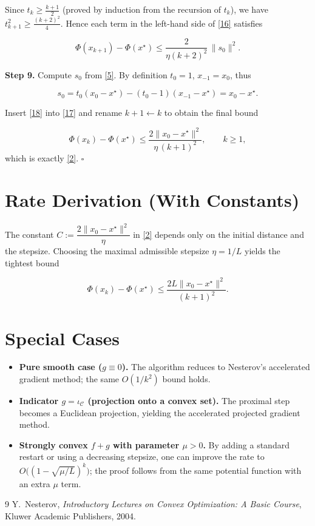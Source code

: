 \documentclass{article}
\begin{document}
Since $t_{k}\ge \frac{k+1}{2}$ (proved by induction from the recursion of $t_k$), we have $t_{k+1}^{2}\ge \frac{(k+2)^{2}}{4}$. Hence each term in the left-hand side of \eqref{16} satisfies  

\[
\Phi(x_{k+1})-\Phi(x^{\star})\le
\frac{2}{\eta (k+2)^{2}}\,\|s_{0}\|^{2}.
\tag{17}
\]

\noindent\textbf{Step 9.}  Compute $s_{0}$ from \eqref{5}.  By definition $t_{0}=1$, $x_{-1}=x_{0}$, thus  

\[
s_{0}=t_{0}(x_{0}-x^{\star})-(t_{0}-1)(x_{-1}-x^{\star})
= x_{0}-x^{\star}.
\tag{18}
\]

Insert \eqref{18} into \eqref{17} and rename $k+1\leftarrow k$ to obtain the final bound

\[
\Phi(x_{k})-\Phi(x^{\star})\le
\frac{2\|x_{0}-x^{\star}\|^{2}}{\eta\, (k+1)^{2}},\qquad k\ge 1,
\]
which is exactly \eqref{2}.  $\square$

\section*{Rate Derivation (With Constants)}
The constant $C:=\dfrac{2\|x_{0}-x^{\star}\|^{2}}{\eta}$ in \eqref{2} depends only on the initial distance and the stepsize.  Choosing the maximal admissible stepsize $\eta=1/L$ yields the tightest bound  

\[
\Phi(x_{k})-\Phi(x^{\star})\le
\frac{2L\|x_{0}-x^{\star}\|^{2}}{(k+1)^{2}}.
\tag{19}
\]

\section*{Special Cases}
\begin{itemize}
\item \textbf{Pure smooth case ($g\equiv0$).}  The algorithm reduces to Nesterov’s accelerated gradient method; the same $O(1/k^{2})$ bound holds.
\item \textbf{Indicator $g=\iota_{\mathcal{C}}$ (projection onto a convex set).}  The proximal step becomes a Euclidean projection, yielding the accelerated projected gradient method.
\item \textbf{Strongly convex $f+g$ with parameter $\mu>0$.}  By adding a standard restart or using a decreasing stepsize, one can improve the rate to $O\bigl((1-\sqrt{\mu/L})^{k}\bigr)$; the proof follows from the same potential function with an extra $\mu$ term.
\end{itemize}

\begin{thebibliography}{9}
Y.~Nesterov, \emph{Introductory Lectures on Convex Optimization: A Basic Course}, Kluwer Academic Publishers, 2004.
\end{thebibliography}
\end{document}
